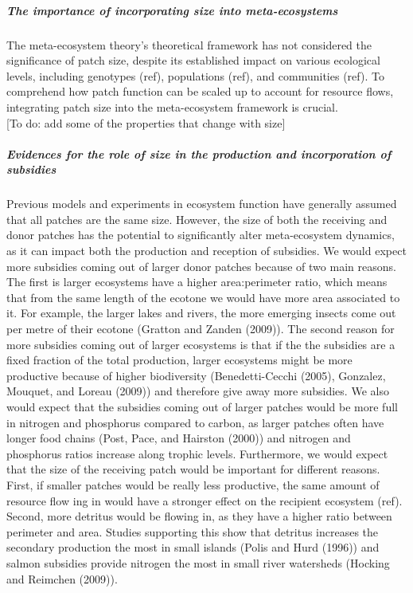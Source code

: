 \documentclass[
]{article}
\begin{document}
\hypertarget{the-importance-of-incorporating-size-into-meta-ecosystems}{%
\subparagraph{The importance of incorporating size into
meta-ecosystems}\label{the-importance-of-incorporating-size-into-meta-ecosystems}}

The meta-ecosystem theory's theoretical framework has not considered the
significance of patch size, despite its established impact on various
ecological levels, including genotypes (ref), populations (ref), and
communities (ref). To comprehend how patch function can be scaled up to
account for resource flows, integrating patch size into the
meta-ecosystem framework is crucial.\\
{[}To do: add some of the properties that change with size{]}

\hypertarget{evidences-for-the-role-of-size-in-the-production-and-incorporation-of-subsidies}{%
\subparagraph{Evidences for the role of size in the production and
incorporation of
subsidies}\label{evidences-for-the-role-of-size-in-the-production-and-incorporation-of-subsidies}}

Previous models and experiments in ecosystem function have generally
assumed that all patches are the same size. However, the size of both
the receiving and donor patches has the potential to significantly alter
meta-ecosystem dynamics, as it can impact both the production and
reception of subsidies. We would expect more subsidies coming out of
larger donor patches because of two main reasons. The first is larger
ecosystems have a higher area:perimeter ratio, which means that from the
same length of the ecotone we would have more area associated to it. For
example, the larger lakes and rivers, the more emerging insects come out
per metre of their ecotone (Gratton and Zanden (2009)). The second
reason for more subsidies coming out of larger ecosystems is that if the
the subsidies are a fixed fraction of the total production, larger
ecosystems might be more productive because of higher biodiversity
(Benedetti-Cecchi (2005), Gonzalez, Mouquet, and Loreau (2009)) and
therefore give away more subsidies. We also would expect that the
subsidies coming out of larger patches would be more full in nitrogen
and phosphorus compared to carbon, as larger patches often have longer
food chains (Post, Pace, and Hairston (2000)) and nitrogen and
phosphorus ratios increase along trophic levels. Furthermore, we would
expect that the size of the receiving patch would be important for
different reasons. First, if smaller patches would be really less
productive, the same amount of resource flow ing in would have a
stronger effect on the recipient ecosystem (ref). Second, more detritus
would be flowing in, as they have a higher ratio between perimeter and
area. Studies supporting this show that detritus increases the secondary
production the most in small islands (Polis and Hurd (1996)) and salmon
subsidies provide nitrogen the most in small river watersheds (Hocking
and Reimchen (2009)).
\end{document}
